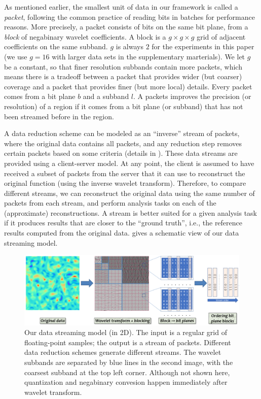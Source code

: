 As mentioned earlier, the smallest unit of data in our framework is called a \emph{packet},
following the common practice of reading bits in batches for performance reasons. More precisely, a
packet consists of bits on the same bit plane, from a \emph{block} of negabinary wavelet
coefficients. A block is a $g\times g\times g$ grid of adjacent coefficients on the same subband.
$g$ is always $2$ for the experiments in this paper (we use $g=16$ with larger data sets in the
supplementary marterials). We let $g$ be a constant, so that finer resolution subbands contain more
packets, which means there is a tradeoff between a packet that provides wider (but coarser) coverage
and a packet that provides finer (but more local) details. Every packet comes from a bit plane $b$
and a subband $l$. A packets improves the precision (or resolution) of a region if it comes from a
bit plane (or subband) that has not been streamed before in the region.

A data reduction scheme can be modeled as an ``inverse'' stream of packets, where the original data
contains all packets, and any reduction step removes certain packets based on some criteria (details
in ).  These data streams are provided using a client-server model.
At any point, the client is assumed to have received a subset of packets from the server that it
can use to reconstruct the original function (using the inverse wavelet transform). Therefore, to
compare different streams, we can reconstruct the original data using the same number of packets
from each stream, and perform analysis tasks on each of the (approximate) reconstructions. A stream
is better suited for a given analysis task if it produces results that are closer to the ``ground
truth'', i.e., the reference results computed from the original data.  gives a
schematic view of our data streaming model.

\begin{figure}[h]
\centering
\includegraphics[width=\linewidth]{img/pipeline.png}
\caption{Our data streaming model (in 2D). The input is a regular grid of floating-point samples;
the output is a stream of packets. Different data reduction schemes generate different streams.  The
wavelet subbands are separated by blue lines in the second image, with the coarsest subband at the
top left corner. Although not shown here, quantization and negabinary convesion happen immediately
after wavelet transform. }\label{fig:pipeline}
\end{figure}

